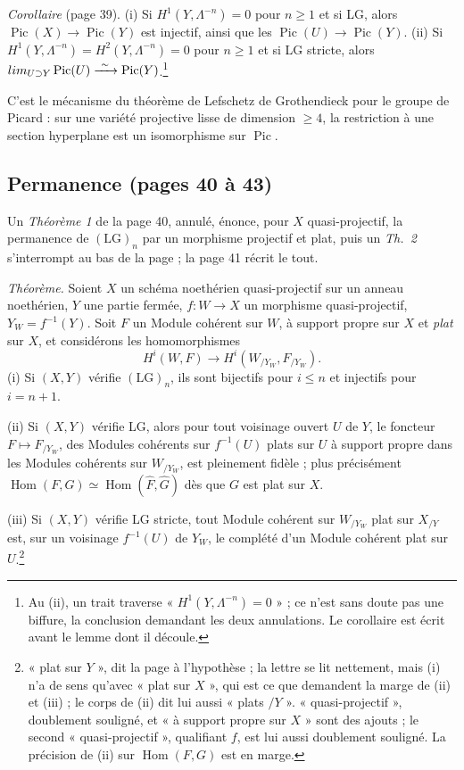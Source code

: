 \documentclass[11pt,a4paper]{article}
\begin{document}
\emph{Corollaire} (page 39). (i) Si $H^1(Y, \Lambda^{-n}) = 0$ pour $n \geq 1$
et si LG, alors $\operatorname{Pic}(X) \to \operatorname{Pic}(Y)$ est injectif,
ainsi que les $\operatorname{Pic}(U) \to \operatorname{Pic}(Y)$. (ii) Si
$H^1(Y, \Lambda^{-n}) = H^2(Y, \Lambda^{-n}) = 0$ pour $n \geq 1$ et si LG
stricte, alors $\varinjlim_{U \supset Y} \operatorname{Pic}(U)
\xrightarrow{\ \sim\ } \operatorname{Pic}(Y)$.\footnote{Au (ii), un trait
traverse « $H^1(Y, \Lambda^{-n}) = 0$ » ; ce n'est sans doute pas une biffure,
la conclusion demandant les deux annulations. Le corollaire est écrit avant le
lemme dont il découle.}

C'est le mécanisme du théorème de Lefschetz de Grothendieck pour le groupe de
Picard : sur une variété projective lisse de dimension $\geq 4$, la
restriction à une section hyperplane est un isomorphisme sur
$\operatorname{Pic}$.

\subsection*{Permanence (pages 40 à 43)}

Un \emph{Théorème 1} de la page 40, annulé, énonce, pour $X$
quasi-projectif, la permanence de $(\mathrm{LG})_n$ par un morphisme projectif
et plat, puis un \emph{Th.~2}
s'interrompt au bas de la page ; la page 41 récrit le tout.

\emph{Théorème.} Soient $X$ un schéma noethérien quasi-projectif sur un anneau
noethérien, $Y$ une partie fermée, $f\colon W \to X$ un morphisme
quasi-projectif,
$Y_W = f^{-1}(Y)$. Soit $F$ un Module cohérent sur $W$, à support propre sur
$X$ et \emph{plat} sur $X$, et considérons les homomorphismes
\[
  H^i(W, F) \longrightarrow H^i(W_{/Y_W}, F_{/Y_W}) .
\]
(i) Si $(X, Y)$ vérifie $(\mathrm{LG})_n$, ils sont bijectifs pour $i \leq n$
et injectifs pour $i = n+1$.

(ii) Si $(X, Y)$ vérifie LG, alors pour tout voisinage ouvert $U$ de $Y$, le
foncteur $F \mapsto F_{/Y_W}$, des Modules cohérents sur $f^{-1}(U)$ plats sur
$U$ à support propre dans les Modules cohérents sur $W_{/Y_W}$, est pleinement
fidèle ; plus précisément
$\operatorname{Hom}(F, G) \simeq \operatorname{Hom}(\widehat{F}, \widehat{G})$
dès que $G$ est plat sur $X$.

(iii) Si $(X, Y)$ vérifie LG stricte, tout Module cohérent sur $W_{/Y_W}$
plat sur $X_{/Y}$ est, sur un voisinage $f^{-1}(U)$ de $Y_W$, le complété
d'un Module cohérent plat sur $U$.\footnote{« plat sur $Y$ », dit la page à
l'hypothèse ; la lettre se lit nettement, mais (i) n'a de sens qu'avec « plat
sur $X$ », qui est ce que demandent la marge de (ii) et (iii) ; le corps de
(ii) dit lui aussi « plats $/Y$ ». « quasi-projectif »,
doublement souligné, et « à support propre sur $X$ » sont des ajouts ; le
second « quasi-projectif », qualifiant $f$, est lui aussi doublement
souligné.
La précision de (ii) sur $\operatorname{Hom}(F, G)$ est en marge.}
\end{document}
